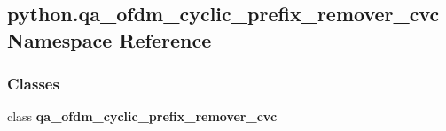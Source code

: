 \subsection{python.\+qa\+\_\+ofdm\+\_\+cyclic\+\_\+prefix\+\_\+remover\+\_\+cvc Namespace Reference}
\label{namespacepython_1_1qa__ofdm__cyclic__prefix__remover__cvc}
\subsubsection*{Classes}
\begin{DoxyCompactItemize}
\item 
class {\bf qa\+\_\+ofdm\+\_\+cyclic\+\_\+prefix\+\_\+remover\+\_\+cvc}
\end{DoxyCompactItemize}
